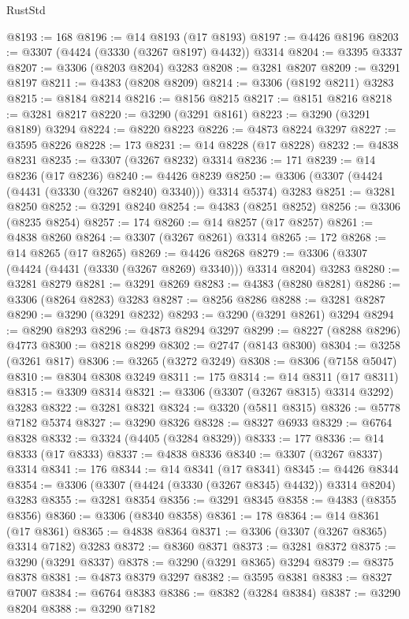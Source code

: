 \begin{lexlean}{RustStd}
\begin{coremodule}
@8193 := 168
@8196 := @14 @8193 (@17 @8193)
@8197 := @4426 @8196
@8203 := @3307 (@4424 (@3330 (@3267 @8197) @4432)) @3314
@8204 := @3395 @3337
@8207 := @3306 (@8203 @8204) @3283
@8208 := @3281 @8207
@8209 := @3291 @8197
@8211 := @4383 (@8208 @8209)
@8214 := @3306 (@8192 @8211) @3283
@8215 := @8184 @8214
@8216 := @8156 @8215
@8217 := @8151 @8216
@8218 := @3281 @8217
@8220 := @3290 (@3291 @8161)
@8223 := @3290 (@3291 @8189) @3294
@8224 := @8220 @8223
@8226 := @4873 @8224 @3297
@8227 := @3595 @8226
@8228 := 173
@8231 := @14 @8228 (@17 @8228)
@8232 := @4838 @8231
@8235 := @3307 (@3267 @8232) @3314
@8236 := 171
@8239 := @14 @8236 (@17 @8236)
@8240 := @4426 @8239
@8250 := @3306 (@3307 (@4424 (@4431 (@3330 (@3267 @8240) @3340))) @3314 @5374) @3283
@8251 := @3281 @8250
@8252 := @3291 @8240
@8254 := @4383 (@8251 @8252)
@8256 := @3306 (@8235 @8254)
@8257 := 174
@8260 := @14 @8257 (@17 @8257)
@8261 := @4838 @8260
@8264 := @3307 (@3267 @8261) @3314
@8265 := 172
@8268 := @14 @8265 (@17 @8265)
@8269 := @4426 @8268
@8279 := @3306 (@3307 (@4424 (@4431 (@3330 (@3267 @8269) @3340))) @3314 @8204) @3283
@8280 := @3281 @8279
@8281 := @3291 @8269
@8283 := @4383 (@8280 @8281)
@8286 := @3306 (@8264 @8283) @3283
@8287 := @8256 @8286
@8288 := @3281 @8287
@8290 := @3290 (@3291 @8232)
@8293 := @3290 (@3291 @8261) @3294
@8294 := @8290 @8293
@8296 := @4873 @8294 @3297
@8299 := @8227 (@8288 @8296) @4773
@8300 := @8218 @8299
@8302 := @2747 (@8143 @8300)
@8304 := @3258 (@3261 @817)
@8306 := @3265 (@3272 @3249)
@8308 := @8306 (@7158 @5047)
@8310 := @8304 @8308 @3249
@8311 := 175
@8314 := @14 @8311 (@17 @8311)
@8315 := @3309 @8314
@8321 := @3306 (@3307 (@3267 @8315) @3314 @3292) @3283
@8322 := @3281 @8321
@8324 := @3320 (@5811 @8315)
@8326 := @5778 @7182 @5374
@8327 := @3290 @8326
@8328 := @8327 @6933
@8329 := @6764 @8328
@8332 := @3324 (@4405 (@3284 @8329))
@8333 := 177
@8336 := @14 @8333 (@17 @8333)
@8337 := @4838 @8336
@8340 := @3307 (@3267 @8337) @3314
@8341 := 176
@8344 := @14 @8341 (@17 @8341)
@8345 := @4426 @8344
@8354 := @3306 (@3307 (@4424 (@3330 (@3267 @8345) @4432)) @3314 @8204) @3283
@8355 := @3281 @8354
@8356 := @3291 @8345
@8358 := @4383 (@8355 @8356)
@8360 := @3306 (@8340 @8358)
@8361 := 178
@8364 := @14 @8361 (@17 @8361)
@8365 := @4838 @8364
@8371 := @3306 (@3307 (@3267 @8365) @3314 @7182) @3283
@8372 := @8360 @8371
@8373 := @3281 @8372
@8375 := @3290 (@3291 @8337)
@8378 := @3290 (@3291 @8365) @3294
@8379 := @8375 @8378
@8381 := @4873 @8379 @3297
@8382 := @3595 @8381
@8383 := @8327 @7007
@8384 := @6764 @8383
@8386 := @8382 (@3284 @8384)
@8387 := @3290 @8204
@8388 := @3290 @7182

\end{coremodule}
\end{lexlean}
